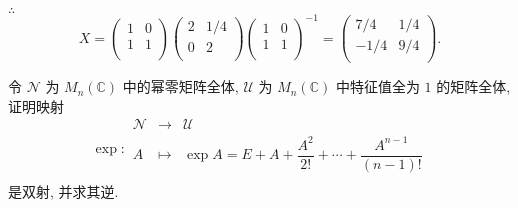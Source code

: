 \documentclass[color=black,device=normal,lang=cn,mode=geye]{elegantnote}
\begin{document}
\begin{solution}
    $\therefore$
    \[X=\begin{pmatrix}
        1 & 0 \\
        1 & 1 \\
    \end{pmatrix}\begin{pmatrix}
        2 & 1/4 \\
        0 & 2 \\
    \end{pmatrix}\begin{pmatrix}
        1 & 0 \\
        1 & 1 \\
    \end{pmatrix}^{-1}=\begin{pmatrix}
        7/4 & 1/4 \\
        -1/4 & 9/4 \\
    \end{pmatrix}.\]
\end{solution}
\begin{exercisec}[2.5.19]
    令 $\mathscr{N}$ 为 $M_n(\mathbb{C})$ 中的幂零矩阵全体, $\mathscr{U}$ 为 $M_n(\mathbb{C})$ 中特征值全为 $1$ 的矩阵全体, 证明映射
    \[\exp:\begin{array}{rcl}
        \mathscr{N} & \to & \mathscr{U} \\
        A & \mapsto & \exp A=E+A+\dfrac{A^2}{2!}+\cdots+\dfrac{A^{n-1}}{(n-1)!} \\
    \end{array}\]
    是双射, 并求其逆.
\end{exercisec}
\end{document}
